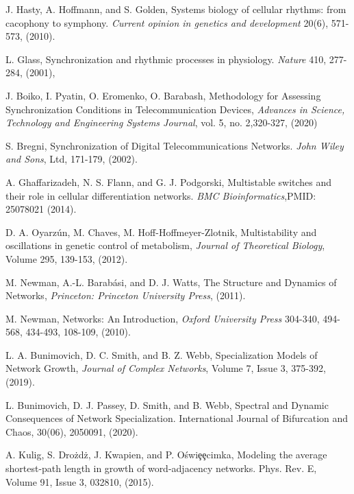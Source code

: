 \documentclass[12pt]{thesis}
\begin{document}
\begin{thebibliography}{99}
 J. Hasty, A. Hoffmann, and S. Golden, Systems biology of cellular rhythms: from cacophony to symphony. \textit{Current opinion in genetics and development} {20(6), 571-573, (2010).}

 L. Glass, Synchronization and rhythmic processes in physiology. \textit{Nature} {410, 277-284, (2001),}

 J. Boiko, I. Pyatin, O. Eromenko, O. Barabash, Methodology for Assessing Synchronization Conditions in Telecommunication Devices, \textit{Advances in Science, Technology and Engineering Systems Journal}, vol. 5, no. 2,{320-327, (2020)}

 S. Bregni, Synchronization of Digital Telecommunications Networks. \textit{John Wiley and Sons}, Ltd, {171-179}, (2002).

 A. Ghaffarizadeh, N. S. Flann, and G. J. Podgorski, Multistable switches and their role in cellular differentiation networks. \textit{BMC Bioinformatics},PMID: 25078021 (2014).

 D. A. Oyarzún, M. Chaves, M. Hoff-Hoffmeyer-Zlotnik, Multistability and oscillations in genetic control of metabolism, \textit{Journal of Theoretical Biology}, Volume 295, {139-153}, (2012).

 M. Newman, A.-L. Barabási, and D. J. Watts, The Structure and Dynamics of Networks, \textit{Princeton: Princeton University Press}, (2011). %

 M. Newman, Networks: An Introduction, \textit{Oxford University Press} {304-340, 494-568, 434-493, 108-109}, (2010).

 L. A. Bunimovich, D. C. Smith, and B. Z. Webb, Specialization Models of Network Growth, \textit{Journal of Complex Networks}, Volume 7, Issue 3, {375-392}, (2019).

 L. Bunimovich, D. J. Passey, D. Smith, and B. Webb, Spectral and Dynamic Consequences of Network Specialization. International Journal of Bifurcation and Chaos, 30(06), 2050091, (2020).

 {A. Kulig, S.  Dro\ifmmode {}\else \.{z}\fi{}d\ifmmode {}\else \.{z}\fi{}, J. Kwapien, and P. O\ifmmode {}\else \'{s}\fi{}wi\ifmmode \mbox{\c{e}}\else \c{e}\fi{}cimka, Modeling the average shortest-path length in growth of word-adjacency networks. Phys. Rev. E, Volume 91, Issue 3, 032810, (2015).}


\end{thebibliography}
\end{document}
